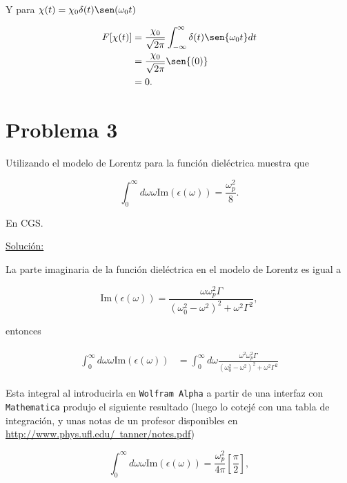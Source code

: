 \documentclass[a4paper,11pt]{article}
\numberwithin{equation}{section}
\begin{document}
Y para $\chi(t) = \chi_0\delta(t)\sen(\omega_0 t)$

\begin{align}
\begin{split}
 F[\chi(t)] &= \frac{\chi_0}{\sqrt{2\pi}} \int_{-\infty}^\infty \delta(t) \sen{\omega_0t}
 dt \\
 &= \frac{\chi_0}{\sqrt{2\pi}}\sen{(0)} \\ 
 &= 0.
\end{split}
\end{align}

\section{Problema 3}

Utilizando el modelo de Lorentz para la función dieléctrica muestra que 

$$
\int_0^\infty d\omega \omega \text{Im}(\epsilon(\omega)) = \frac{\omega_p^2}{8}.
$$

En CGS.

\vspace{.3cm}

\underline{Solución:} \vspace{.3cm}

La parte imaginaria de la función dieléctrica en el modelo de Lorentz es igual a 

\begin{equation}
 \text{Im}(\epsilon(\omega)) = \frac{\omega \omega_p^2 \Gamma}{(\omega_0^2 - \omega^2)^2 
 + \omega^2 \Gamma^2},
\end{equation}

entonces 

\begin{align}
\begin{split}
 \int_0^\infty d\omega \omega \text{Im}(\epsilon(\omega)) &=  
 \int_0^\infty d\omega \frac{\omega^2 \omega_p^2 \Gamma}{(\omega_0^2 - \omega^2)^2 
 + \omega^2 \Gamma^2}
\end{split}
\end{align}

Esta integral al introducirla en \texttt{Wolfram Alpha} a partir de una interfaz 
con \texttt{Mathematica} produjo el siguiente resultado (luego lo cotejé 
con una tabla de integración, y unas notas de un profesor disponibles en 
\href{http://www.phys.ufl.edu/~tanner/notes.pdf}{http://www.phys.ufl.edu/~tanner/notes.pdf}) 

\begin{equation}
 \int_0^\infty d\omega \omega \text{Im}(\epsilon(\omega)) = \frac{\omega_p^2}{4\pi} 
 \left[\frac{\pi}{2}\right], 
\end{equation}
\end{document}
